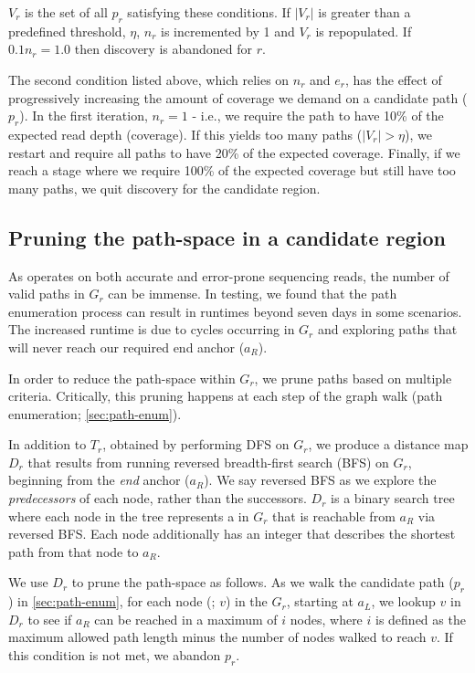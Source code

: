 $V_r$ is the set of all $p_r$ satisfying these conditions. If $|V_r|$ is greater than a predefined threshold, $\eta$, $n_r$ is incremented by 1 and $V_r$ is repopulated. If $0.1n_r = 1.0$ then \denovo{} discovery is abandoned for $r$.

The second condition listed above, which relies on $n_r$ and $e_r$, has the effect of progressively increasing the amount of coverage we demand on a candidate path ($p_r$). In the first iteration, $n_r=1$ - i.e., we require the path to have 10\% of the expected read depth (coverage). If this yields too many paths ($|V_r|>\eta$), we restart and require all paths to have 20\% of the expected coverage. Finally, if we reach a stage where we require 100\% of the expected coverage but still have too many paths, we quit \denovo{} discovery for the candidate region.

\subsection{Pruning the path-space in a candidate region}
\label{sec:denovo-prune}

As \pandora{} operates on both accurate and error-prone sequencing reads, the number of valid paths in $G_r$ can be immense. In testing, we found that the path enumeration process can result in runtimes beyond seven days in some scenarios. The increased runtime is due to cycles occurring in $G_r$ and exploring paths that will never reach our required end anchor ($a_R$). 

In order to reduce the path-space within $G_r$, we prune paths based on multiple criteria. Critically, this pruning happens at each step of the graph walk (path enumeration; \autoref{sec:path-enum}).

In addition to $T_r$, obtained by performing DFS on $G_r$, we produce a distance map $D_r$ that results from running reversed breadth-first search (BFS) on $G_r$, beginning from the \emph{end} anchor ($a_R$). We say reversed BFS as we explore the \emph{predecessors} of each node, rather than the successors. $D_r$ is a binary search tree where each node in the tree represents a \kmer{} in $G_r$ that is reachable from $a_R$ via reversed BFS. Each node additionally has an integer that describes the shortest path from that node to $a_R$.

We use $D_r$ to prune the path-space as follows. As we walk the candidate path ($p_r$) in \autoref{sec:path-enum}, for each node (\kmer{}; $v$) in the \dbg{} $G_r$, starting at $a_L$, we lookup $v$ in $D_r$ to see if $a_R$ can be reached in a maximum of $i$ nodes, where $i$ is defined as the maximum allowed path length minus the number of nodes walked to reach $v$. If this condition is not met, we abandon $p_r$. 

